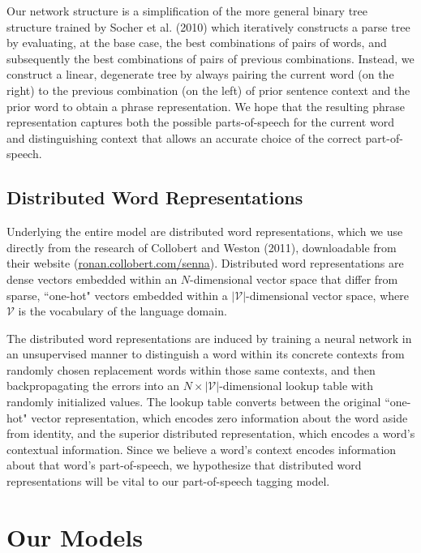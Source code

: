 \documentclass[11pt]{article}
\begin{document}
Our network structure is a simplification of the more general binary tree structure trained by Socher et al. (2010) which iteratively constructs a parse tree by evaluating, at the base case, the best combinations of pairs of words, and subsequently the best combinations of pairs of previous combinations. Instead, we construct a linear, degenerate tree by always pairing the current word (on the right) to the previous combination (on the left) of prior sentence context and the prior word to obtain a phrase representation. We hope that the resulting phrase representation captures both the possible parts-of-speech for the current word and distinguishing context that allows an accurate choice of the correct part-of-speech.

\subsection{Distributed Word Representations}

Underlying the entire model are distributed word representations, which we use directly from the research of Collobert and Weston (2011), downloadable from their website (\hyperlink{http://ronan.collobert.com/senna/}{ronan.collobert.com/senna}). Distributed word representations are dense vectors embedded within an $N$-dimensional vector space that differ from sparse, ``one-hot" vectors embedded within a $\left\vert\mathcal{V}\right\vert$-dimensional vector space, where $\mathcal{V}$ is the vocabulary of the language domain.

The distributed word representations are induced by training a neural network in an unsupervised manner to distinguish a word within its concrete contexts from randomly chosen replacement words within those same contexts, and then backpropagating the errors into an $N\times\left\vert\mathcal{V}\right\vert$-dimensional lookup table with randomly initialized values. The lookup table converts between the original ``one-hot" vector representation, which encodes zero information about the word aside from identity, and the superior distributed representation, which encodes a word's contextual information. Since we believe a word's context encodes information about that word's part-of-speech, we hypothesize that distributed word representations will be vital to our part-of-speech tagging model.

\section{Our Models}
\end{document}
